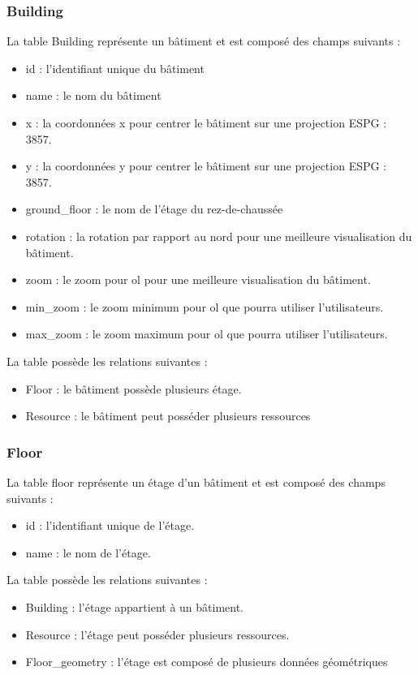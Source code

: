 \documentclass[
    iai, %
    il, %
]{heig-tb}
\begin{document}
\subsubsection{Building}
La table Building représente un bâtiment et est composé des champs suivants :

\begin{itemize}
    \item id : l'identifiant unique du bâtiment
    \item name : le nom du bâtiment
    \item x : la coordonnées x pour centrer le bâtiment sur une projection ESPG : 3857.
    \item y : la coordonnées y pour centrer le bâtiment sur une projection ESPG : 3857.
    \item ground\_floor : le nom de l'étage du rez-de-chaussée
    \item rotation : la rotation par rapport au nord pour une meilleure visualisation du bâtiment.
    \item zoom : le zoom pour \gls{ol} pour une meilleure visualisation du bâtiment.
    \item min\_zoom : le zoom minimum pour \gls{ol} que pourra utiliser l'utilisateurs.
    \item max\_zoom : le zoom maximum pour \gls{ol} que pourra utiliser l'utilisateurs.
\end{itemize}

La table possède les relations suivantes :
\begin{itemize}
    \item Floor : le bâtiment possède plusieurs étage.
    \item Resource : le bâtiment peut posséder plusieurs ressources
\end{itemize}

\subsubsection{Floor}
La table floor représente un étage d'un bâtiment et est composé des champs suivants :

\begin{itemize}
    \item id : l'identifiant unique de l'étage.
    \item name : le nom de l'étage.
\end{itemize}

La table possède les relations suivantes :
\begin{itemize}
    \item Building : l'étage appartient à un bâtiment.
    \item Resource : l'étage peut posséder plusieurs ressources.
    \item Floor\_geometry : l'étage est composé de plusieurs données géométriques
\end{itemize}
\end{document}
